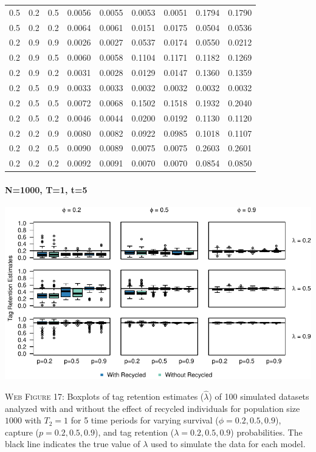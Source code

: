 \documentclass[]{article}
\let\oldparagraph\paragraph
\renewcommand{\paragraph}[1]{\oldparagraph{#1}\mbox{}}
\begin{document}
\begin{table}[ht]
{\begin{tabular}{rrrrrrrrr}
  0.5 & 0.2 & 0.5 & 0.0056 & 0.0055 & 0.0053 & 0.0051 & 0.1794 & 0.1790 \\ 
  0.5 & 0.2 & 0.2 & 0.0064 & 0.0061 & 0.0151 & 0.0175 & 0.0504 & 0.0536 \\ 
  0.2 & 0.9 & 0.9 & 0.0026 & 0.0027 & 0.0537 & 0.0174 & 0.0550 & 0.0212 \\ 
  0.2 & 0.9 & 0.5 & 0.0060 & 0.0058 & 0.1104 & 0.1171 & 0.1182 & 0.1269 \\ 
  0.2 & 0.9 & 0.2 & 0.0031 & 0.0028 & 0.0129 & 0.0147 & 0.1360 & 0.1359 \\ 
  0.2 & 0.5 & 0.9 & 0.0033 & 0.0033 & 0.0032 & 0.0032 & 0.0032 & 0.0032 \\ 
  0.2 & 0.5 & 0.5 & 0.0072 & 0.0068 & 0.1502 & 0.1518 & 0.1932 & 0.2040 \\ 
  0.2 & 0.5 & 0.2 & 0.0046 & 0.0044 & 0.0200 & 0.0192 & 0.1130 & 0.1120 \\ 
  0.2 & 0.2 & 0.9 & 0.0080 & 0.0082 & 0.0922 & 0.0985 & 0.1018 & 0.1107 \\ 
  0.2 & 0.2 & 0.5 & 0.0090 & 0.0089 & 0.0075 & 0.0075 & 0.2603 & 0.2601 \\ 
  0.2 & 0.2 & 0.2 & 0.0092 & 0.0091 & 0.0070 & 0.0070 & 0.0854 & 0.0850 \\ 
   \hline
\end{tabular}
}
\endgroup
\end{table}

\newpage

\paragraph{N=1000, T=1, t=5}\label{n1000-t1-t5-2}

\includegraphics{Appendix_files/figure-latex/figure17_tagretention_GJSTL5-1.pdf}

\textsc{Web Figure 17:} Boxplots of tag retention estimates
(\(\hat{\lambda}\)) of 100 simulated datasets analyzed with and without
the effect of recycled individuals for population size \(1000\) with
\(T_2=1\) for 5 time periods for varying survival
(\(\phi=0.2,0.5,0.9\)), capture (\(p=0.2,0.5,0.9\)), and tag retention
(\(\lambda=0.2,0.5,0.9\)) probabilities. The black line indicates the
true value of \(\lambda\) used to simulate the data for each model.
\end{document}

